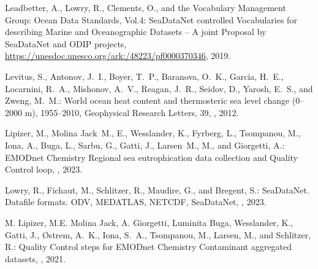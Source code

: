 \documentclass[essd, manuscript]{copernicus}
\begin{document}
\begin{thebibliography}{52}
Leadbetter, A., Lowry, R., Clements, O., and {the Vocabulary Management Group}:
  Ocean Data Standards, Vol.4: SeaDataNet controlled Vocabularies for
  describing Marine and Oceanographic Datasets – A joint Proposal by
  SeaDataNet and ODIP projects,
  \urlprefix\url{https://unesdoc.unesco.org/ark:/48223/pf0000370346}, 2019.

Levitus, S., Antonov, J.~I., Boyer, T.~P., Baranova, O.~K., Garcia, H.~E.,
  Locarnini, R.~A., Mishonov, A.~V., Reagan, J.~R., Seidov, D., Yarosh, E.~S.,
  and Zweng, M.~M.: World ocean heat content and thermosteric sea level change
  (0–2000 m), 1955–2010, Geophysical Research Letters, 39,
  , 2012.

Lipizer, M., Molina Jack~M., E., Wesslander, K., Fyrberg, L., Tsompanou, M.,
  Iona, A., Buga, L., Sarbu, G., Gatti, J., Larsen~M., M., and Giorgetti, A.:
  EMODnet Chemistry Regional sea eutrophication data collection and Quality
  Control loop, , 2023.

Lowry, R., Fichaut, M., Schlitzer, R., Maudire, G., and Bregent, S.:
  {SeaDataNet. Datafile formats. ODV, MEDATLAS, NETCDF}, SeaDataNet,
  , 2023.

{M. Lipizer}, {M.E. Molina Jack}, {A. Giorgetti}, {Luminita Buga}, Wesslander,
  K., Gatti, J., Østrem, A.~K., Iona, S.~A., Tsompanou, M., Larsen, M., and
  Schlitzer, R.: Quality Control steps for EMODnet Chemistry Contaminant
  aggregated datasets, ,
  2021.


\end{thebibliography}
\end{document}
